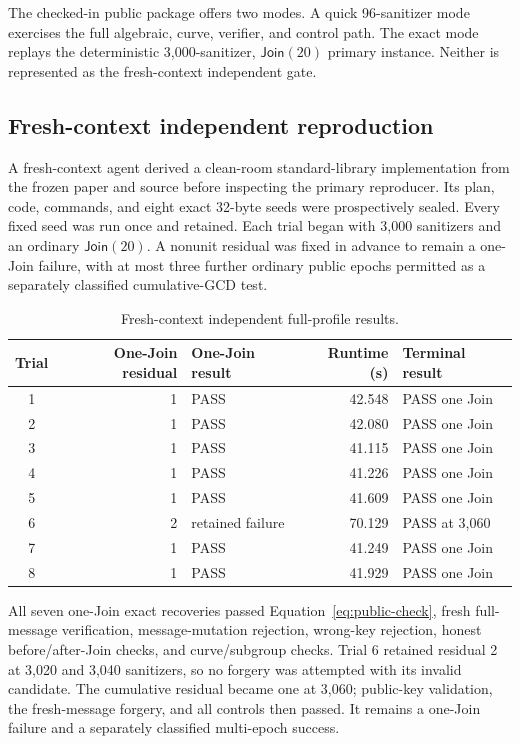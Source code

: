 \documentclass[10pt,a4paper]{article}
\newcommand{\DJoin}{\mathsf{Join}}
\begin{document}
The checked-in public package offers two modes. A quick 96-sanitizer mode
exercises the full algebraic, curve, verifier, and control path. The exact mode
replays the deterministic 3,000-sanitizer, \(\DJoin(20)\) primary instance.
Neither is represented as the fresh-context independent gate.

\subsection{Fresh-context independent reproduction}

A fresh-context agent derived a clean-room standard-library implementation
from the frozen paper and source before inspecting the primary reproducer. Its
plan, code, commands, and eight exact 32-byte seeds were prospectively sealed.
Every fixed seed was run once and retained. Each trial began with 3,000
sanitizers and an ordinary \(\DJoin(20)\). A nonunit residual was fixed in
advance to remain a one-Join failure, with at most three further ordinary
public epochs permitted as a separately classified cumulative-GCD test.

\begin{table}[ht]
\centering
\caption{Fresh-context independent full-profile results.}
\label{tab:independent}
\begin{tabular}{@{}crlrl@{}}
\toprule
Trial & One-Join residual & One-Join result & Runtime (s) & Terminal result \\
\midrule
1 & 1 & PASS & 42.548 & PASS one Join \\
2 & 1 & PASS & 42.080 & PASS one Join \\
3 & 1 & PASS & 41.115 & PASS one Join \\
4 & 1 & PASS & 41.226 & PASS one Join \\
5 & 1 & PASS & 41.609 & PASS one Join \\
6 & 2 & retained failure & 70.129 & PASS at 3,060 \\
7 & 1 & PASS & 41.249 & PASS one Join \\
8 & 1 & PASS & 41.929 & PASS one Join \\
\bottomrule
\end{tabular}
\end{table}

All seven one-Join exact recoveries passed Equation~\eqref{eq:public-check},
fresh full-message verification, message-mutation rejection, wrong-key
rejection, honest before/after-Join checks, and curve/subgroup checks. Trial 6
retained residual 2 at 3,020 and 3,040 sanitizers, so no forgery was attempted
with its invalid candidate. The cumulative residual became one at 3,060;
public-key validation, the fresh-message forgery, and all controls then passed.
It remains a one-Join failure and a separately classified multi-epoch success.
\end{document}
